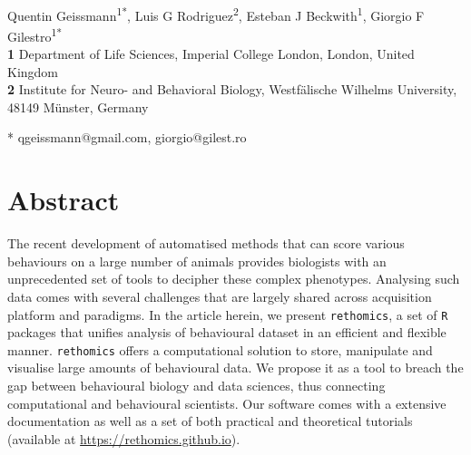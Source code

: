 \documentclass[10pt,letterpaper]{article}\usepackage[]{graphicx}\usepackage[]{color}
\date{}
\begin{document}
\vspace*{0.2in}

\begin{flushleft}
{\Large
\textbf{} 
}
\newline
\\
Quentin Geissmann\textsuperscript{1*},
Luis G Rodriguez\textsuperscript{2},
Esteban J Beckwith\textsuperscript{1},
Giorgio F Gilestro\textsuperscript{1*}
\\
\bigskip
\textbf{1} Department of Life Sciences, Imperial College London, London, United Kingdom
\\
\textbf{2} Institute for Neuro- and Behavioral Biology, Westf{\"a}lische Wilhelms University, 48149 M{\"u}nster, Germany
\\
\bigskip


* qgeissmann@gmail.com, giorgio@gilest.ro

\end{flushleft}
\section*{Abstract}
The recent development of automatised methods that can score various behaviours on a large number of animals
provides biologists with an unprecedented set of tools to decipher these complex phenotypes. 
Analysing such data comes with several challenges that are largely shared across acquisition platform and paradigms.
In the article herein, we present \texttt{rethomics}, a set of \texttt{R} packages that unifies analysis of behavioural dataset in an efficient and flexible manner.
\texttt{rethomics} offers a computational solution to store, manipulate and visualise large amounts of behavioural data.
We propose it as a tool to breach the gap between behavioural biology and data sciences, thus connecting computational and behavioural scientists.
Our software comes with a extensive documentation as well as a set of both practical and theoretical tutorials (available at \href{https://rethomics.github.io}{https://rethomics.github.io}).
\end{document}
